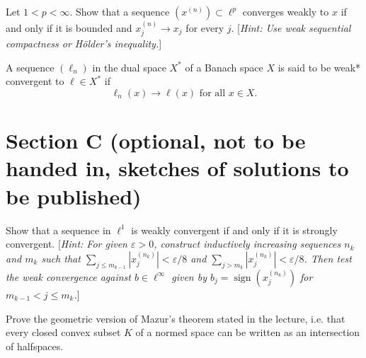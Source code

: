 \documentclass[answers]{exam}
\begin{document}
\begin{questions}
\question%
Let $1<p<\infty$. Show that a sequence $(x^{(n)}) \subset \ell^{p}$ converges weakly to $x$ if and only if it is bounded and $x_{j}^{(n)} \to x_{j}$ for every $j$. [\emph{Hint: Use weak sequential compactness or Hölder's inequality.}]



\question%
A sequence $(\ell_{n})$ in the dual space $X^{*}$ of a Banach space $X$ is said to be weak* convergent to $\ell \in X^{*}$ if \[
	\ell_{n}(x) \to \ell(x) \text { for all } x \in X.
\]

\end{questions}



\section*{Section C \large(optional, not to be handed in, sketches of solutions to be published)}

\begin{questions}

\question%
Show that a sequence in $\ell^{1}$ is weakly convergent if and only if it is strongly convergent.
[\emph{Hint: For given $\varepsilon>0$, construct inductively increasing sequences $n_{k}$ and $m_{k}$ such that $\sum_{j \leqslant m_{k-1}}|x_{j}^{(n_{k})}|<\varepsilon / 8$ and $\sum_{j>m_{k}}|x_{j}^{(n_{k})}|<\varepsilon / 8$. Then test the weak convergence against $b \in \ell^{\infty}$ given by $b_{j}=\operatorname{sign}(x_{j}^{(n_{k})})$ for $m_{k-1}<j \leqslant m_{k}$.}]



\question%
Prove the geometric version of Mazur's theorem stated in the lecture, i.e. that every closed convex subset $K$ of a normed space can be written as an intersection of halfspaces.

\end{questions}
\end{document}
